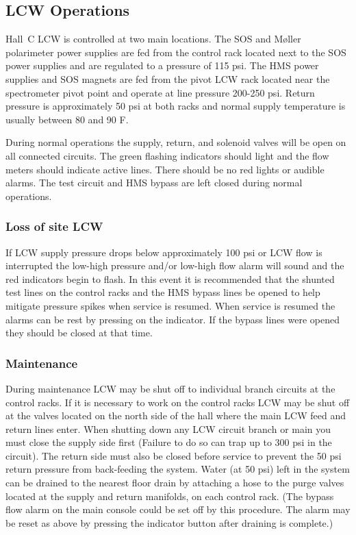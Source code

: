 \subsection{LCW Operations}

Hall~C LCW is controlled at two main locations.  The SOS and M\o ller
polarimeter power supplies are fed from the control rack located next to
the SOS power supplies and are regulated to a pressure of 115 psi.  The
HMS power supplies and SOS magnets are fed from the pivot LCW rack
located near the spectrometer pivot point and operate at line
pressure 200-250 psi.  Return pressure is approximately 50 psi at both
racks and normal supply temperature is usually between 80 and 90 F.

During normal operations the supply, return, and solenoid valves will be
open on all connected circuits.  The green flashing indicators should
light and the flow meters should indicate active lines.  There should be 
no red lights or audible alarms.  
The test circuit and HMS bypass are left closed during
normal operations.

\subsubsection{Loss of site LCW}

If LCW supply pressure drops below approximately 100 psi or LCW flow is
interrupted the low-high pressure and/or low-high flow alarm will sound
and the red indicators begin to flash.  In this event it is recommended
that the shunted test lines on the control racks and the HMS bypass
lines be opened to help mitigate pressure spikes when service is
resumed.  When service is resumed the alarms can be rest by pressing on
the indicator.  If the bypass lines were opened they should be closed at
that time.

\subsubsection{Maintenance}

During maintenance LCW may be shut off to individual branch circuits at
the control racks.  If it is necessary to work on the control racks LCW
may be shut off at the valves located on the north side of the hall
where the main LCW feed and return lines enter.  When shutting down any
LCW circuit branch or main you must close the supply side first (Failure
to do so can trap up to 300 psi in the circuit).  The return side must
also be closed before service to prevent the 50 psi return pressure from
back-feeding the system.  Water (at 50 psi) left in the system can be
drained to the nearest floor drain by attaching a hose to the purge
valves located at the supply and return manifolds, on each control rack.
(The bypass flow alarm on the main console could be set off by this
procedure.  The alarm may be reset as above by pressing the indicator
button after draining is complete.)

